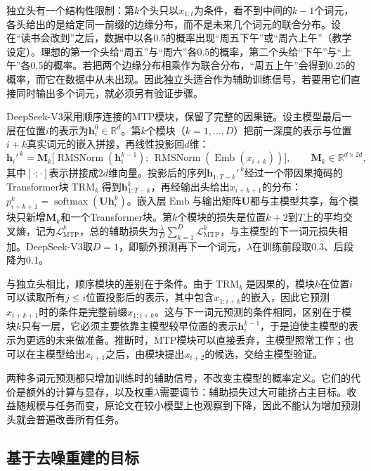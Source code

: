 独立头有一个结构性限制：第$k$个头只以$x_{1:t}$为条件，看不到中间的$k-1$个词元，各头给出的是给定同一前缀的边缘分布，而不是未来几个词元的联合分布。设在“读书会改到”之后，数据中以各0.5的概率出现“周五下午”或“周六上午”（教学设定）。理想的第一个头给“周五”与“周六”各0.5的概率，第二个头给“下午”与“上午”各0.5的概率。若把两个边缘分布相乘作为联合分布，“周五上午”会得到0.25的概率，而它在数据中从未出现。因此独立头适合作为辅助训练信号，若要用它们直接同时输出多个词元，就必须另有验证步骤。

DeepSeek-V3采用顺序连接的MTP模块，保留了完整的因果链。设主模型最后一层在位置$i$的表示为$\bm h_i^{0}\in\mathbb R^{d}$。第$k$个模块（$k=1,\ldots,D$）把前一深度的表示与位置$i+k$真实词元的嵌入拼接，再线性投影回$d$维：
\begin{equation}
 \bm h_i'^{\,k}=\bm M_k\bigl[\operatorname{RMSNorm}(\bm h_i^{k-1});\,
 \operatorname{RMSNorm}(\operatorname{Emb}(x_{i+k}))\bigr],
 \qquad \bm M_k\in\mathbb R^{d\times 2d},
 \label{eq:nlp-llm-mtp-sequential}
\end{equation}
其中$[\cdot;\cdot]$表示拼接成$2d$维向量。投影后的序列$\bm h_{1:T-k}'^{\,k}$经过一个带因果掩码的Transformer块$\operatorname{TRM}_k$得到$\bm h_{1:T-k}^{k}$，再经输出头给出$x_{i+k+1}$的分布：$p^{k}_{i+k+1}=\operatorname{softmax}(\bm U\bm h_i^{k})$。嵌入层$\operatorname{Emb}$与输出矩阵$\bm U$都与主模型共享，每个模块只新增$\bm M_k$和一个Transformer块。第$k$个模块的损失是位置$k+2$到$T$上的平均交叉熵，记为$\mathcal L_{\mathrm{MTP}}^{k}$，总的辅助损失为$\frac{\lambda}{D}\sum_{k=1}^{D}\mathcal L_{\mathrm{MTP}}^{k}$，与主模型的下一词元损失相加。DeepSeek-V3取$D=1$，即额外预测再下一个词元，$\lambda$在训练前段取0.3、后段降为0.1。

与独立头相比，顺序模块的差别在于条件。由于$\operatorname{TRM}_k$是因果的，模块$k$在位置$i$可以读取所有$j\leq i$位置投影后的表示，其中包含$x_{1:i+k}$的嵌入，因此它预测$x_{i+k+1}$时的条件是完整前缀$x_{1:i+k}$。这与下一词元预测的条件相同，区别在于模块$k$只有一层，它必须主要依靠主模型较早位置的表示$\bm h_i^{k-1}$，于是迫使主模型的表示为更远的未来做准备。推断时，MTP模块可以直接丢弃，主模型照常工作；也可以在主模型给出$x_{i+1}$之后，由模块提出$x_{i+2}$的候选，交给主模型验证。

两种多词元预测都只增加训练时的辅助信号，不改变主模型的概率定义。它们的代价是额外的计算与显存，以及权重$\lambda$需要调节：辅助损失过大可能挤占主目标。收益随规模与任务而变，原论文在较小模型上也观察到下降，因此不能认为增加预测头就会普遍改善所有任务。

\subsection{基于去噪重建的目标}
\label{sec:nlp-llm-objective-denoising}

